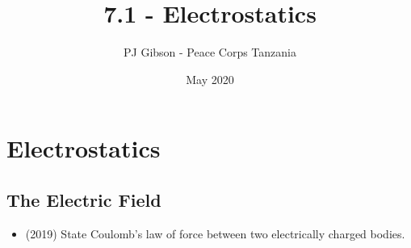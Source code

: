 \documentclass{article}
\title{7.1 - Electrostatics}
\author{PJ Gibson - Peace Corps Tanzania}
\date{May 2020}
\begin{document}
\maketitle


\section{Electrostatics}

\subsection{The Electric Field}
\begin{itemize}
\item (2019)  State Coulomb’s law of force between two electrically charged bodies. 
\end{itemize}
\end{document}
